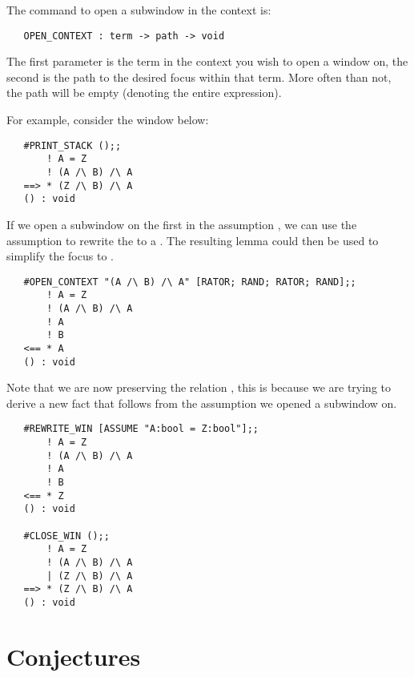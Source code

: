 The command to open a subwindow in the context is:
\begin{boxed}\begin{verbatim}
   OPEN_CONTEXT : term -> path -> void
\end{verbatim}\end{boxed}
The first parameter is the term in the context you wish to open a window on,
the second is the path to the desired focus within that term.
More often than not, the path will be empty (denoting the entire expression).

For example, consider the window below:
\setcounter{sessioncount}{1}
\begin{session}\begin{verbatim}
   #PRINT_STACK ();;
       ! A = Z
       ! (A /\ B) /\ A
   ==> * (Z /\ B) /\ A
   () : void
\end{verbatim}\end{session}
If we open a subwindow on the first  in the assumption
, 
we can use the assumption  to rewrite the  to a .
The resulting lemma could then be used to simplify the focus to .
\begin{session}\begin{verbatim}
   #OPEN_CONTEXT "(A /\ B) /\ A" [RATOR; RAND; RATOR; RAND];;
       ! A = Z
       ! (A /\ B) /\ A
       ! A
       ! B
   <== * A
   () : void
\end{verbatim}\end{session}
Note that we are now preserving the relation ,
this is because we are trying to derive a new fact that follows from 
the assumption we opened a subwindow on.
\begin{session}\begin{verbatim}
   #REWRITE_WIN [ASSUME "A:bool = Z:bool"];;
       ! A = Z
       ! (A /\ B) /\ A
       ! A
       ! B
   <== * Z
   () : void
   
   #CLOSE_WIN ();;
       ! A = Z
       ! (A /\ B) /\ A
       | (Z /\ B) /\ A
   ==> * (Z /\ B) /\ A
   () : void
\end{verbatim}\end{session}

\section{Conjectures}	\label{sec:con}

